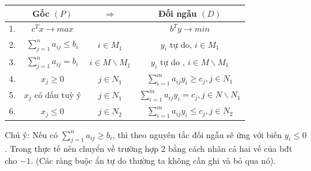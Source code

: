 \documentclass{article}
\begin{document}
\begin{center}
    \begin{tabular}{|c|c|c|c|}
        \hline
        & Gốc $(P)$ & $\Rightarrow$ & Đối ngẫu $(D)$ \\
        \hline
        1. & $c^Tx \rightarrow max$ && $b^Ty \rightarrow min$ \\
        \hline
        2. &  $\sum_{j=1}^n a_{ij} \leq b_i$ & $i \in M_1$ & $y_i$ tự do, $i \in M_1$ \\
        \hline
        3. & $\sum_{j=1}^n a_{ij} = b_i$ & $i \in M \backslash M_1$ & $y_i$ tự do , $i \in M\backslash M_1$ \\
        \hline
        4. & $x_j \geq 0$ & $j \in N_1$ & $\sum_{i=1}^m a_{ij}y_i \geq c_j , j \in N_1$ \\
        \hline
        5. & $x_j$ có dấu tuỳ ý & $j \in N_1$ & $\sum_{i=1}^m a_{ij} y_i = c_j , j \in N\backslash N_1$ \\
        \hline
        6. & $x_j \leq 0$ & $j \in N_2$ & $\sum_{i=1}^m a_{ij}y_i \leq c_j , j \in N_2$ \\
        \hline
    \end{tabular}
\end{center}
Chú ý: Nếu có $\sum_{j=1}^n a_{ij} \geq b_i$, thì theo nguyên tắc 
đối ngẫu sẽ ứng với biến $y_i \leq 0$. Trong thực tế nên chuyển về
 trường hợp 2 bằng cách nhân cả hai vế của bđt cho $-1$. (Các ràng
  buộc ẩn tự do thường ta không cần ghi và bỏ qua nó).
\end{document}
